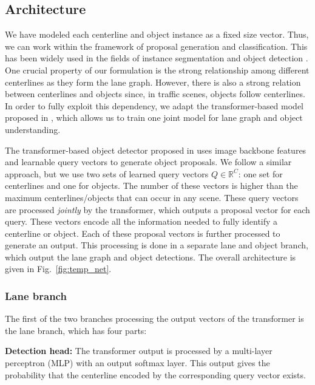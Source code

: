 \documentclass[10pt,twocolumn,letterpaper]{article}
\begin{document}
\subsection{Architecture}
We have modeled each centerline and object instance as a fixed size vector. Thus, we can work within the framework of proposal generation and classification. This has been widely used in the fields of instance segmentation and object detection \cite{DBLP:journals/pami/RenHG017, he2017, DBLP:conf/eccv/CarionMSUKZ20}. One crucial property of our formulation is the strong relationship among different centerlines as they form the lane graph. However, there is also a strong relation between centerlines and objects since, in traffic scenes, objects follow centerlines. In order to fully exploit this dependency, we adapt the transformer-based model proposed in \cite{DBLP:conf/eccv/CarionMSUKZ20}, which allows us to train one joint model for lane graph and object understanding. 

The transformer-based object detector proposed in \cite{DBLP:conf/eccv/CarionMSUKZ20} uses image backbone features and learnable query vectors to generate object proposals. We follow a similar approach, but we use two sets of learned query vectors $Q \in \!\mathbb{R}^{C}$: one set for centerlines and one for objects. The number of these vectors is higher than the maximum centerlines/objects that can occur in any scene. These query vectors are processed \emph{jointly} by the transformer, which outputs a proposal vector for each query. These vectors encode all the information needed to fully identify a centerline or object. Each of these proposal vectors is further processed to generate an output. This processing is done in a separate lane and object branch, which output the lane graph and object detections. The overall architecture is given in Fig.~\ref{fig:temp_net}. 



\subsubsection{Lane branch}
The first of the two branches processing the output vectors of the transformer is the lane branch, which has four parts:


\noindent\textbf{Detection head:} The transformer output is processed by a multi-layer perceptron (MLP) with an output softmax layer. This output gives the probability that the centerline encoded by the corresponding query vector exists. 
\end{document}
